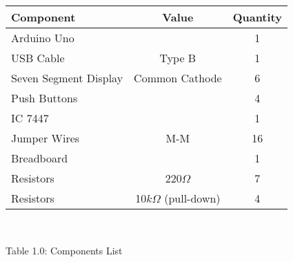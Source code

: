 \centering
\begin{tabular}{|l|c|c|}
\hline
Component & Value & Quantity\\
\hline
Arduino Uno & & 1\\
\hline
USB Cable & Type B & 1\\
\hline
Seven Segment Display & Common Cathode & 6\\
\hline
Push Buttons & & 4\\
\hline
IC 7447  &  & 1\\
\hline
Jumper Wires & M-M & 16\\
\hline
Breadboard & & 1\\
\hline
Resistors & 220$\Omega$ & 7\\
\hline
Resistors & 10$k\Omega$ (pull-down) & 4\\
\hline
\end{tabular}\\
\centerline{Table 1.0: Components List}
